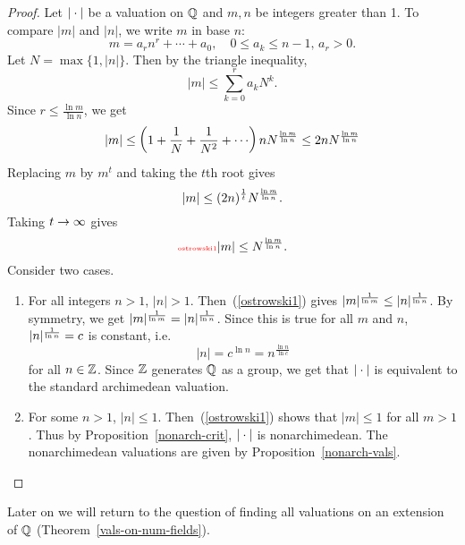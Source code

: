 \begin{proof}
Let $|\cdot|$ be a valuation on $\mathbb{Q}$ and $m,n$ be integers greater than 1. To compare $|m|$ and $|n|$, we write $m$ in base $n$:
\[
m=a_rn^r+\cdots +a_0, \quad 0\le a_k\le n-1, \,a_r>0.
\]
Let $N=\max\{1,|n|\}$. Then by the triangle inequality,
\[
|m|\le \sum_{k=0}^r a_kN^k.
\]
Since $r\le \frac{\ln m}{\ln n}$, we get
\[
|m|\le \left( {1+\frac{1}{N}+\frac{1}{N^2}+\cdots } \right)nN^{\frac{\ln m}{\ln n}}
\le 2nN^{\frac{\ln m}{\ln n}}
\]
Replacing $m$ by $m^t$ and taking the $t$th root gives
\[
|m|\le %
(2n)^{\rc t}N^{\frac{\ln m}{\ln n}}.
\]
Taking $t\to \infty$ %
gives
\begin{equation}\llabel{ostrowski1}
|m|\le N^{\frac{\ln m}{\ln n}}.
\end{equation}
Consider two cases.
\begin{enumerate}
\item For all integers $n>1$, $|n|>1$. Then~(\ref{ostrowski1}) gives $|m|^{\frac{1}{\ln m}}\le |n|^{\frac{1}{\ln n}}$. By symmetry, we get $|m|^{\frac{1}{\ln m}}= |n|^{\frac{1}{\ln n}}$. Since this is true for all $m$ and $n$, $|n|^{\frac{1}{\ln n}}=c$ is constant, i.e.
\[
|n|=c^{\ln n}=n^{\frac{\ln n}{\ln c}}
\]
for all $n\in \mathbb{Z}$. Since $\mathbb{Z}$ generates $\mathbb{Q}$ as a group, we get that $|\cdot|$ is equivalent to the standard archimedean valuation.
\item For some $n>1$, $|n|\le 1$. Then~(\ref{ostrowski1}) shows that $|m|\le 1$ for all $m>1$. Thus by Proposition~\ref{nonarch-crit}, $|\cdot|$ is nonarchimedean.
The nonarchimedean valuations are given by Proposition~\ref{nonarch-vals}.\qedhere
\end{enumerate}
\end{proof}
Later on we will return to the question of finding all valuations on an extension of $\mathbb{Q}$ (Theorem~\ref{vals-on-num-fields}).

